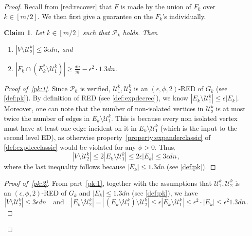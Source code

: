 \documentclass[epsfig,letter,11pt]{article}
\numberwithin{equation}{section}
\newtheorem{claim}[theorem]{Claim}
\begin{document}
\begin{proof}
Recall from \cref{red:recover} that $F$ is made by the union of $F_k$ over 	$k \in [m/2]$. We then first give a guarantee on the $F_k$'s individually.
	\begin{claim}
		\label{claim:pkrecover}
		Let $k \in [m/2]$ such that $\mathcal{P}_k$ holds. Then
		\begin{enumerate}
			\item \label{pk:1} $|V \setminus \mathcal{U}_2^k| \le 3 \epsilon dn$, and
			\item \label{pk:2} $|F_k  \cap (E^*_k \setminus \mathcal{U}^k_1) | \ge \frac{dn}{m}-\epsilon^2 \cdot 1.3 dn$.
		\end{enumerate}
	\end{claim}
	\begin{proof}[Proof of~\eqref{pk:1}]
		Since $\mathcal{P}_k$ is verified, $\mathcal{U}_1^k,\mathcal{U}_2^k$ is an $(\epsilon,\phi,2)$-RED of  $G_k$ (see \cref{def:pk}). By definition of RED (see \cref{def:expdecrec}), we know $|E_k \setminus \mathcal{U}^k_1| \le \epsilon |E_k|$. Moreover, one can note that the number of non-isolated vertices in $ \mathcal{U}_2^k$ is at most twice the number of edges in $E_k \setminus  \mathcal{U}_1^k$. This is because every non isolated vertex must have at least one edge incident on it in $E_k \setminus  \mathcal{U}_1^k$ (which is the input to the second level ED), as otherwise property~\eqref{property:expanderclassic} of \cref{def:expdecclassic} would be violated for any $\phi > 0 $. Thus,
		\begin{equation*}
			|V \setminus \mathcal{U}_2^k| \le 2|E_k \setminus \mathcal{U}^k_1| \le 2\epsilon |E_k|  \le 3 \epsilon dn\, ,
		\end{equation*}
		where the last inequality follows because $|E_k|\le 1.3 dn$ (see \cref{def:pk}).
	\end{proof}
	\begin{proof}[Proof of~\eqref{pk:2}]
		From part~\eqref{pk:1}, together with the assumptions that $\mathcal{U}_1^k,\mathcal{U}_2^k$ is an $(\epsilon,\phi,2)$-RED of $G_k$ and $|E_k|\le 1.3 dn$ (see \cref{def:pk}), we have
		\begin{equation*}
			\left|V \setminus \mathcal{U}^k_2 \right|   \le 3\epsilon dn\quad \text{and} \quad \left|E_k \setminus \mathcal{U}_2^k \right| = \left|\left(E_k \setminus \mathcal{U}_1^k \right) \setminus \mathcal{U}_2^k\right| \le \epsilon \left|E_k \setminus \mathcal{U}_1^k \right| \le \epsilon^2 \cdot |E_k| \le \epsilon^2 1.3 dn\, .
		\end{equation*}

\end{proof}
\end{proof}
\end{document}
